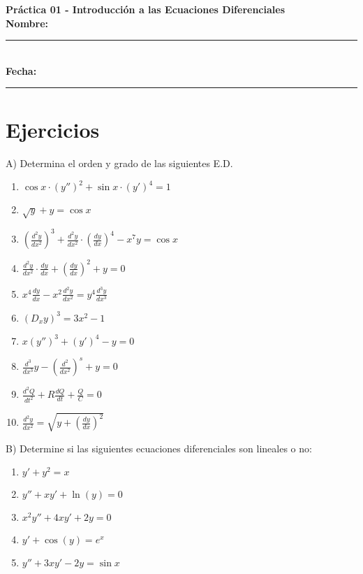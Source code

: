 \documentclass[a4paper,12pt]{article}
\begin{document}
\begin{center}
    \Huge\textbf{Práctica 01 - Introducción a las Ecuaciones Diferenciales}\\[1cm]
    \Large \textbf{Nombre:} \rule{10cm}{0.4pt} \\
    \Large \textbf{Fecha:} \rule{5cm}{0.4pt}
\end{center}

\section*{Ejercicios}
A) Determina el orden y grado de las siguientes E.D.
\large

\begin{enumerate}[label=\Large\arabic*.]
    \item $\displaystyle \cos x \cdot \left( y'' \right)^2 + \sin x \cdot \left( y' \right)^4 = 1$
    \item $\displaystyle \sqrt{y} + y = \cos x$
    \item $\displaystyle \left(\frac{d^2 y}{dx^2}\right)^3 + \frac{d^2 y}{dx^2} \cdot \left(\frac{dy}{dx}\right)^4 - x^7 y = \cos x$
    \item $\displaystyle \frac{d^2 y}{dx^2} \cdot \frac{dy}{dx} + \left(\frac{dy}{dx}\right)^2 + y = 0$
    \item $\displaystyle x^4 \frac{dy}{dx} - x^2 \frac{d^2 y}{dx^2} = y^4 \frac{d^3 y}{dx^3}$
    \item $\displaystyle (D_x y)^3 = 3x^2 - 1$
    \item $\displaystyle x \left( y'' \right)^3 + \left( y' \right)^4 - y = 0$
    \item $\displaystyle \frac{d^3}{dx^3} y - \left(\frac{d^2}{dx^2} \right)^s + y = 0$
    \item $\displaystyle \frac{d^2Q}{dt^2} + R \frac{dQ}{dt} + \frac{Q}{C} = 0$
    \item $\displaystyle \frac{d^2 y}{dx^2} = \sqrt{y + \left(\frac{dy}{dx}\right)^2}$
\end{enumerate}

B) Determine si las siguientes ecuaciones diferenciales son lineales o no:
\large
\begin{enumerate}[label=\Large\arabic*.]
    \item $\displaystyle y' + y^2 = x$
    \item $\displaystyle y'' + x y' + \ln(y) = 0$
    \item $\displaystyle x^2 y'' + 4xy' + 2y = 0$
    \item $\displaystyle y' + \cos(y) = e^x$
    \item $\displaystyle y'' + 3xy' - 2y = \sin x$
\end{enumerate}
\end{document}

